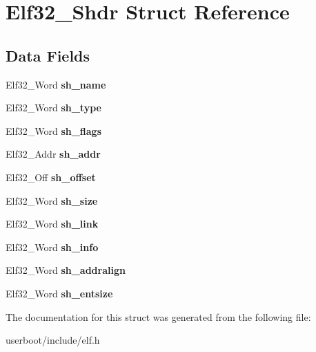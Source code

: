 \hypertarget{structElf32__Shdr}{}\section{Elf32\+\_\+\+Shdr Struct Reference}
\label{structElf32__Shdr}
\subsection*{Data Fields}
\begin{DoxyCompactItemize}
\item 
Elf32\+\_\+\+Word {\bfseries sh\+\_\+name}\hypertarget{structElf32__Shdr_a6e8fd300ca473a31d0f65817ce371dfd}{}\label{structElf32__Shdr_a6e8fd300ca473a31d0f65817ce371dfd}

\item 
Elf32\+\_\+\+Word {\bfseries sh\+\_\+type}\hypertarget{structElf32__Shdr_aab6c221dbd7e16987df41280fb915408}{}\label{structElf32__Shdr_aab6c221dbd7e16987df41280fb915408}

\item 
Elf32\+\_\+\+Word {\bfseries sh\+\_\+flags}\hypertarget{structElf32__Shdr_a27e003d8da37de3038a0065577a7743d}{}\label{structElf32__Shdr_a27e003d8da37de3038a0065577a7743d}

\item 
Elf32\+\_\+\+Addr {\bfseries sh\+\_\+addr}\hypertarget{structElf32__Shdr_a7e668a62cee74a2f9c6edabb5f45635a}{}\label{structElf32__Shdr_a7e668a62cee74a2f9c6edabb5f45635a}

\item 
Elf32\+\_\+\+Off {\bfseries sh\+\_\+offset}\hypertarget{structElf32__Shdr_a6e37227a5777cddc0a9dbbb3c2598ec1}{}\label{structElf32__Shdr_a6e37227a5777cddc0a9dbbb3c2598ec1}

\item 
Elf32\+\_\+\+Word {\bfseries sh\+\_\+size}\hypertarget{structElf32__Shdr_a84dc67bb0ab65880bbcd74fbee722ff1}{}\label{structElf32__Shdr_a84dc67bb0ab65880bbcd74fbee722ff1}

\item 
Elf32\+\_\+\+Word {\bfseries sh\+\_\+link}\hypertarget{structElf32__Shdr_ad759308388eb14c5c6e4d636c38999da}{}\label{structElf32__Shdr_ad759308388eb14c5c6e4d636c38999da}

\item 
Elf32\+\_\+\+Word {\bfseries sh\+\_\+info}\hypertarget{structElf32__Shdr_aef63fe62c2c9927f374c4f987954c6e5}{}\label{structElf32__Shdr_aef63fe62c2c9927f374c4f987954c6e5}

\item 
Elf32\+\_\+\+Word {\bfseries sh\+\_\+addralign}\hypertarget{structElf32__Shdr_a399f50b3591e6286d4ad819f790979ed}{}\label{structElf32__Shdr_a399f50b3591e6286d4ad819f790979ed}

\item 
Elf32\+\_\+\+Word {\bfseries sh\+\_\+entsize}\hypertarget{structElf32__Shdr_a10c59cecc928aae27930601fe545d3ca}{}\label{structElf32__Shdr_a10c59cecc928aae27930601fe545d3ca}

\end{DoxyCompactItemize}


The documentation for this struct was generated from the following file\+:\begin{DoxyCompactItemize}
\item 
userboot/include/elf.\+h\end{DoxyCompactItemize}
